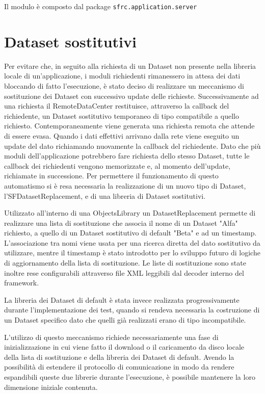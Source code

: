 Il modulo \`e composto dal package \texttt{sfrc.application.server}

\section{Dataset sostitutivi}
\label{sec:dataset_sost}
Per evitare che, in seguito alla richiesta di un Dataset non presente nella libreria locale di un'applicazione, i moduli richiedenti rimanessero in attesa dei dati bloccando di fatto l'esecuzione, \`e stato deciso di realizzare un meccanismo di sostituzione dei Dataset con successivo update delle richieste.
Successivamente ad una richiesta il RemoteDataCenter restituisce, attraverso la callback del richiedente, un Dataset sostitutivo temporaneo di tipo compatibile a quello richiesto.
Contemporaneamente viene generata una richiesta remota che attende di essere evasa. Quando i dati effettivi arrivano dalla rete viene eseguito un update del dato richiamando nuovamente la callback del richiedente.
Dato che pi\`u moduli dell'applicazione potrebbero fare richiesta dello stesso Dataset, tutte le callback dei richiedenti vengono memorizzate e, al momento dell'update, richiamate in successione.
Per permettere il funzionamento di questo automatismo si \`e resa necessaria la realizzazione di un nuovo tipo di Dataset, l'SFDatasetReplacement, e di una libreria di Dataset sostitutivi.

Utilizzato all'interno di una ObjectsLibrary un DatasetReplacement permette di realizzare una lista di sostituzione che associa il nome di un Dataset "Alfa" richiesto, a quello di un Dataset sostitutivo di default "Beta" e ad un timestamp.
L'associazione tra nomi viene usata per una ricerca diretta del dato sostitutivo da utilizzare, mentre il timestamp \`e stato introdotto per lo sviluppo futuro di logiche di aggiornamento della lista di sostituzione.
Le liste di sostituzione sono state inoltre rese configurabili attraverso file XML leggibili dal decoder interno del framework.

La libreria dei Dataset di default \`e stata invece realizzata progressivamente durante l'implementazione dei test, quando si rendeva necessaria la costruzione di un Dataset specifico dato che quelli gi\`a realizzati erano di tipo incompatibile.

L'utilizzo di questo meccanismo richiede necessariamente una fase di inizializzazione in cui viene fatto il download o il caricamento da disco locale della lista di sostituzione e della libreria dei Dataset di default. Avendo la possibilit\`a di estendere il protocollo di comunicazione in modo da rendere espandibili queste due librerie durante l'esecuzione, \`e possibile mantenere la loro dimensione iniziale contenuta.

